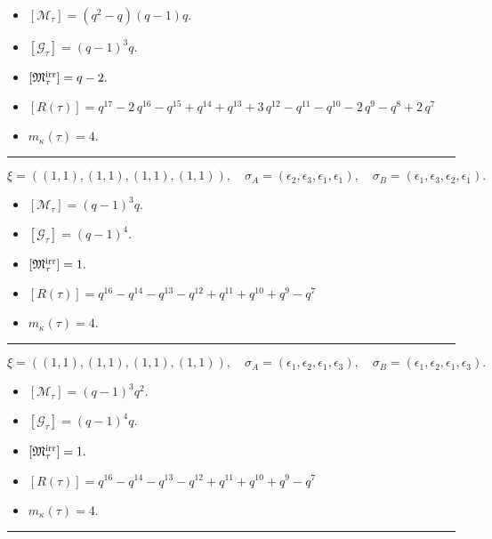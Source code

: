 \documentclass[10pt,a4paper]{amsart}
\begin{document}
\begin{itemize}
 \item $[\mathcal{M}_{\tau}] = {\left(q^{2} - q\right)} {\left(q - 1\right)} q .$

 \item $[\mathcal{G}_{\tau}] = {\left(q - 1\right)}^{3} q .$

 \item $[{\frak M}_{\tau}^{\textrm{irr}}] = q - 2 .$

 \item $[R(\tau)] = q^{17} - 2 \, q^{16} - q^{15} + q^{14} + q^{13} + 3 \, q^{12} - q^{11} - q^{10} - 2 \, q^{9} - q^{8} + 2 \, q^{7} $

 \item $m_{\kappa}(\tau) = 4 .$

 \end{itemize}
\noindent\rule{8cm}{0.4pt}

$$\xi = ({(1, 1)}, {(1, 1)}, {(1, 1), (1, 1)}),\quad \sigma_A = ({{\epsilon_2}}, {{\epsilon_3}}, {{\epsilon_1}, {\epsilon_1}}),\quad \sigma_B = ({{\epsilon_1}}, {{\epsilon_3}}, {{\epsilon_2}, {\epsilon_1}}).$$

\begin{itemize}
 \item $[\mathcal{M}_{\tau}] = {\left(q - 1\right)}^{3} q .$

 \item $[\mathcal{G}_{\tau}] = {\left(q - 1\right)}^{4} .$

 \item $[{\frak M}_{\tau}^{\textrm{irr}}] = 1 .$

 \item $[R(\tau)] = q^{16} - q^{14} - q^{13} - q^{12} + q^{11} + q^{10} + q^{9} - q^{7} $

 \item $m_{\kappa}(\tau) = 4 .$

 \end{itemize}
\noindent\rule{8cm}{0.4pt}

$$\xi = ({(1, 1)}, {(1, 1)}, {(1, 1)}, {(1, 1)}),\quad \sigma_A = ({{\epsilon_1}}, {{\epsilon_2}}, {{\epsilon_1}}, {{\epsilon_3}}),\quad \sigma_B = ({{\epsilon_1}}, {{\epsilon_2}}, {{\epsilon_1}}, {{\epsilon_3}}).$$

\begin{itemize}
 \item $[\mathcal{M}_{\tau}] = {\left(q - 1\right)}^{3} q^{2} .$

 \item $[\mathcal{G}_{\tau}] = {\left(q - 1\right)}^{4} q .$

 \item $[{\frak M}_{\tau}^{\textrm{irr}}] = 1 .$

 \item $[R(\tau)] = q^{16} - q^{14} - q^{13} - q^{12} + q^{11} + q^{10} + q^{9} - q^{7} $

 \item $m_{\kappa}(\tau) = 4 .$

 \end{itemize}
\noindent\rule{8cm}{0.4pt}
\end{document}

